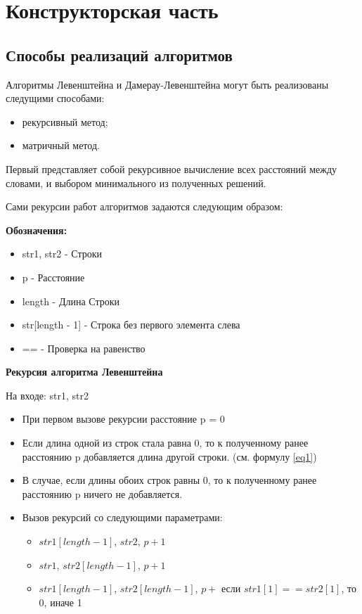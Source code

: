 \documentclass[12pt]{report}
\begin{document}
    
    
    \chapter{Конструкторская часть}
    
    \section{Способы реализаций алгоритмов}
    Алгоритмы Левенштейна и Дамерау-Левенштейна могут быть реализованы следущими способами:
    \begin{itemize}
    	\item рекурсивный метод;
    	\item матричный метод.
    \end{itemize}


    Первый представляет собой рекурсивное вычисление всех расстояний между словами, и выбором минимального из полученных решений.
    
    Сами рекурсии работ алгоритмов задаются следующим образом:
    \vspace{0.5cm}
    
    {\bf Обозначения:}
    \begin{itemize}
    	\item str1, str2 - Строки
    	\item p - Расстояние
    	\item length - Длина Строки
    	\item str[length - 1] - Строка без первого элемента слева
    	\item == - Проверка на равенство
    \end{itemize}
    \vspace{0.5cm}
    
    {\bf Рекурсия алгоритма Левенштейна}
   	
    На входе: str1, str2
    \begin{itemize}
    	\item При первом вызове рекурсии расстояние p = 0
    	\item Если длина одной из строк стала равна 0, то к полученному ранее расстоянию p добавляется длина другой строки.  (см. формулу \ref{eq1})
    	\item В случае, если длины обоих строк равны 0, то к полученному ранее расстоянию p ничего не добавляется.
    	\item Вызов рекурсий со следующими параметрами:
    	\begin{itemize}
    		\item $str1[length - 1]$, $str2$, $p + 1$
    		\item $str1$, $str2[length - 1]$, $p + 1$
    		\item $str1[length - 1]$, $str2[length - 1]$, $p + $ если $str1[1] == str2[1]$, то 0, иначе 1
    	\end{itemize}
    \end{itemize}
\end{document}
